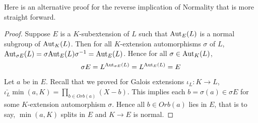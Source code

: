 \documentclass[../book.tex]{subfiles}
\begin{document}
Here is an alternative proof for the reverse implication of Normality
that is more straight forward.

\begin{proof}
    
        Suppose $E$ is a $K$-subextension of $L$ such that 
        $\text{Aut}_{E}(L)$ is a normal subgroup of $\text{Aut}_{K}(L)$.
        Then for all $K$-extension automorphisms $\sigma$ of $L$, 
        $\text{Aut}_{\sigma E}(L) = \sigma \text{Aut}_{E}(L) \sigma^{-1} = \text{Aut}_{E}(L)$.
        Hence for all $\sigma \in \text{Aut}_{K}(L)$, \[
            \sigma E = L^{\text{Aut}_{\sigma E}(L)} = L^{\text{Aut}_{E}(L)} = E
        \]
        
        Let $a$ be in $E$. 
        Recall that we proved for Galois extensions $\iota_L : K \to L$,
        $\bar{\iota_L} \min(a,K) = \prod_{b \in Orb(a)} (X - b)$. 
        This implies each $b = \sigma(a) \in \sigma E$
        for some $K$-extension automorphism $\sigma$.
        Hence all $b \in Orb(a)$ lies in $E$,
        that is to say, $\min(a,K)$ splits in $E$ and $K \to E$ is normal. 
        
    
\end{proof}
\end{document}

